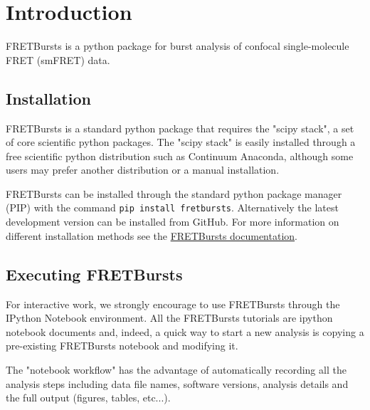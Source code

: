 \section{Introduction}

FRETBursts is a python package for burst analysis of confocal single-molecule FRET 
(smFRET) data.

\subsection{Installation}
FRETBursts is a standard python package that requires the "scipy stack", a set of core 
scientific python packages.
The "scipy stack" is easily installed through a free scientific python distribution such as Continuum Anaconda, although some users may prefer another distribution or a manual installation.

FRETBursts can be installed through the standard python package manager (PIP) with 
the command \texttt{pip install fretbursts}. Alternatively the latest development version can be installed from GitHub.
For more information on different installation methods see the \href{http://fretbursts.readthedocs.org/en/latest/installation.html}{FRETBursts documentation}.

\subsection{Executing FRETBursts}
For interactive work, we strongly encourage to use FRETBursts through the IPython Notebook environment. All the FRETBursts tutorials are ipython notebook documents and, indeed, a quick way to start a new analysis is copying a pre-existing FRETBursts notebook and modifying it.

The "notebook workflow"\cite{Shen_2014} has the advantage of automatically recording all the analysis steps including
data file names, software versions, analysis details and the full output (figures, tables, etc...).
